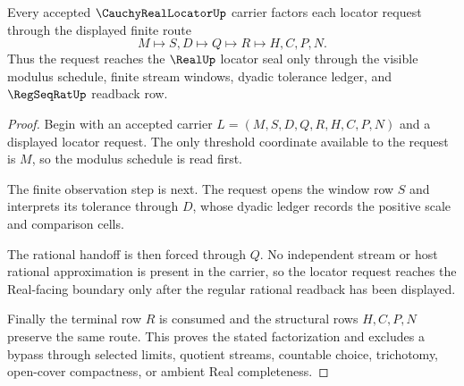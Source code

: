 \begin{theorem}
\label{thm:cauchy-real-locator-modulus-route}
Every accepted $\CauchyRealLocatorUp$ carrier factors each locator request through the displayed finite route
$$
M \longmapsto S,D \longmapsto Q \longmapsto R \longmapsto H,C,P,N .
$$
Thus the request reaches the $\RealUp$ locator seal only through the visible modulus schedule, finite stream windows, dyadic tolerance ledger, and $\RegSeqRatUp$ readback row.
\end{theorem}
\begin{proof}
Begin with an accepted carrier $L=(M,S,D,Q,R,H,C,P,N)$ and a displayed locator request. The only threshold coordinate available to the request is $M$, so the modulus schedule is read first.

The finite observation step is next. The request opens the window row $S$ and interprets its tolerance through $D$, whose dyadic ledger records the positive scale and comparison cells.

The rational handoff is then forced through $Q$. No independent stream or host rational approximation is present in the carrier, so the locator request reaches the Real-facing boundary only after the regular rational readback has been displayed.

Finally the terminal row $R$ is consumed and the structural rows $H,C,P,N$ preserve the same route. This proves the stated factorization and excludes a bypass through selected limits, quotient streams, countable choice, trichotomy, open-cover compactness, or ambient Real completeness.
\end{proof}

